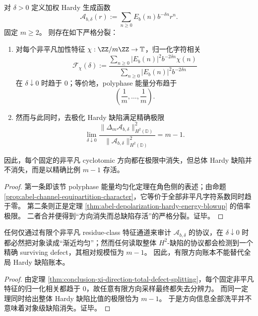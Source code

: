 \begin{theorem}\label{thm:conclusion-xi-direction-total-defect-splitting}
对 \(\delta>0\) 定义加权 Hardy 生成函数
\[
\mathcal A_{b,\delta}(r):=\sum_{n\ge 0}E_b(n)b^{-\delta n}r^n.
\]
固定 \(m\ge 2\)。
则存在如下严格分裂：
\begin{enumerate}
  \item 对每个非平凡加性特征 \(\chi:\ZZ/m\ZZ\to\mathbb T\)，归一化字符相关
  \[
  \mathcal F_\chi(\delta):=
  \frac{\sum_{n\ge 0}|E_b(n)|^2b^{-2\delta n}\chi(n)}
  {\sum_{n\ge 0}|E_b(n)|^2b^{-2\delta n}}
  \]
  在 \(\delta\downarrow 0\) 时趋于 \(0\)；等价地，polyphase 能量分布趋于
  \[
  \left(\frac1m,\dots,\frac1m\right).
  \]

  \item 然而与此同时，去极化 Hardy 缺陷满足精确极限
  \[
  \lim_{\delta\downarrow 0}
  \frac{\|\Delta_m\mathcal A_{b,\delta}\|_{H^2(\mathbb D)}^2}
  {\|\mathcal A_{b,\delta}\|_{H^2(\mathbb D)}^2}
  =
  m-1.
  \]
\end{enumerate}
因此，每个固定的非平凡 cyclotomic 方向都在极限中消失，但总体 Hardy 缺陷并不消失，而是以精确比例 \(m-1\) 存活。
\end{theorem}
\begin{proof}
第一条即该节 polyphase 能量均匀化定理在角色侧的表述；由命题 \ref{prop:abel-channel-equipartition-character}，它等价于全部非平凡字符系数同时趋于零。
第二条则正是定理 \ref{thm:abel-depolarization-hardy-energy-blowup} 的倍率极限。
二者合并便得到“方向消失而总缺陷存活”的严格分裂。证毕。
\end{proof}

\begin{corollary}[有限方向账本的绝对失明]\label{cor:conclusion-xi-finite-direction-ledger-blindness}
任何仅通过有限个非平凡 residue-class 特征通道来审计 \(\mathcal A_{b,\delta}\) 的协议，在 \(\delta\downarrow 0\) 时都必然把对象读成“渐近均匀”；然而任何读取整体 \(H^2\)-缺陷的协议都会检测到一个精确 surviving defect，其相对规模恒为 \(m-1\)。
因此，有限方向账本不能替代全局 Hardy 缺陷账本。
\end{corollary}
\begin{proof}
由定理 \ref{thm:conclusion-xi-direction-total-defect-splitting}，每个固定非平凡特征的归一化相关都趋于 \(0\)，故任意有限方向采样最终都失去分辨力。
而同一定理同时给出整体 Hardy 缺陷比值的极限恰为 \(m-1\)。
于是方向信息全部洗平并不意味着对象级缺陷消失。证毕。
\end{proof}


